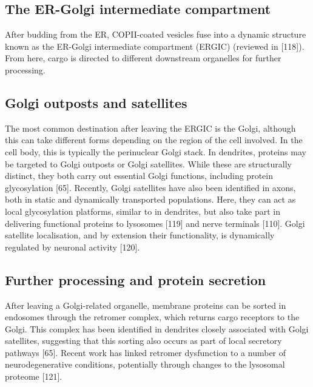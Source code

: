 \documentclass[
  12pt,
  a4paper,
]{book}
\begin{document}
\hypertarget{the-er-golgi-intermediate-compartment}{%
\subsection{The ER-Golgi intermediate compartment}\label{the-er-golgi-intermediate-compartment}}

After budding from the ER, COPII-coated vesicles fuse into a dynamic structure known as the ER-Golgi intermediate compartment (ERGIC) (reviewed in {[}118{]}). From here, cargo is directed to different downstream organelles for further processing.

\hypertarget{golgi-outposts-and-satellites}{%
\subsection{Golgi outposts and satellites}\label{golgi-outposts-and-satellites}}

The most common destination after leaving the ERGIC is the Golgi, although this can take different forms depending on the region of the cell involved. In the cell body, this is typically the perinuclear Golgi stack. In dendrites, proteins may be targeted to Golgi outposts or Golgi satellites. While these are structurally distinct, they both carry out essential Golgi functions, including protein glycosylation {[}65{]}. Recently, Golgi satellites have also been identified in axons, both in static and dynamically transported populations. Here, they can act as local glycosylation platforms, similar to in dendrites, but also take part in delivering functional proteins to lysosomes {[}119{]} and nerve terminals {[}110{]}. Golgi satellite localisation, and by extension their functionality, is dynamically regulated by neuronal activity {[}120{]}.

\hypertarget{further-processing-and-protein-secretion}{%
\subsection{Further processing and protein secretion}\label{further-processing-and-protein-secretion}}

After leaving a Golgi-related organelle, membrane proteins can be sorted in endosomes through the retromer complex, which returns cargo receptors to the Golgi. This complex has been identified in dendrites closely associated with Golgi satellites, suggesting that this sorting also occurs as part of local secretory pathways {[}65{]}. Recent work has linked retromer dysfunction to a number of neurodegenerative conditions, potentially through changes to the lysosomal proteome {[}121{]}.
\end{document}
